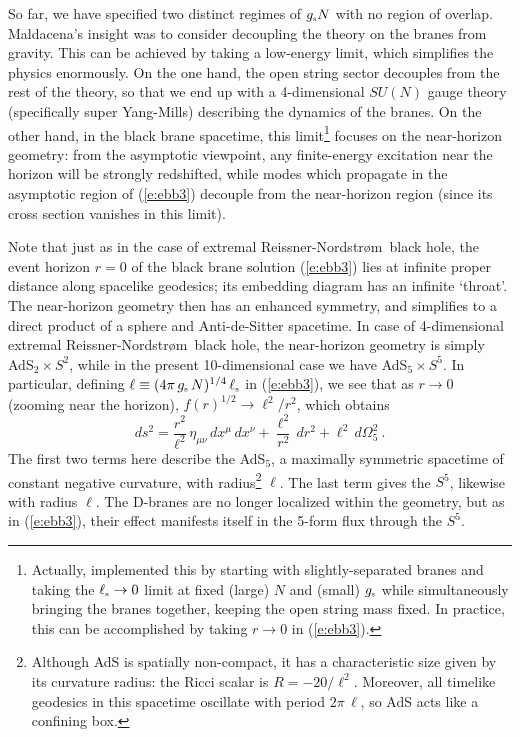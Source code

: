 \documentclass[12pt]{article}
\def\req#1{(\ref{#1})}
\def\RN{Reissner-Nordstr\o m}
\def\gst{g_{\scriptscriptstyle {\rm s}}}
\def\lst{\ell_{\scriptscriptstyle {\rm s}}}
\def\adss#1#2{AdS$_{#1} \times S^{#2}$}
\def\Rads{\ell}
\begin{document}
So far, we have specified two distinct regimes of $\gst N$ with no region of overlap.  Maldacena's insight was to consider decoupling the theory on the branes from gravity.  This can be achieved by taking a low-energy limit, which simplifies the physics enormously.    
On the one hand, the open string sector decouples from the rest of the theory, so that we end up with a 4-dimensional $SU(N)$ gauge theory (specifically super Yang-Mills) describing the dynamics of the branes.  On the other hand, in the black brane spacetime, this limit\footnote{
Actually, \cite{Maldacena:1997re} implemented this by starting with slightly-separated branes and taking the $\lst \to 0$ limit at fixed (large) $N$ and (small) $\gst$ while simultaneously bringing the branes together, keeping the open string mass fixed.  In practice, this can be accomplished by taking $r \to 0$ in \req{e:ebb3}. } focuses on the near-horizon geometry:  from the asymptotic viewpoint, any finite-energy excitation near the horizon will be strongly redshifted, while modes which propagate in the asymptotic region of \req{e:ebb3} decouple from the near-horizon region (since its cross section vanishes in this limit). 

Note that just as in the case of extremal \RN\ black hole,  the event horizon $r=0$ of the black brane solution  \req{e:ebb3} lies at infinite proper distance along spacelike geodesics; its embedding diagram has an infinite `throat'. The near-horizon geometry then has an enhanced symmetry, and simplifies to a direct product of a sphere and Anti-de-Sitter spacetime.  In case of 4-dimensional extremal \RN\ black hole, the near-horizon geometry is simply \adss22,  while in the present 10-dimensional case we have \adss55.  In particular, defining  $\Rads \equiv (4 \pi \, \gst \, N)^{1/4} \, \lst$ in \req{e:ebb3}, we see that  as $r \to 0$ (zooming near the horizon), 
$f(r)^{1/2} \to \Rads^2/r^2$, which obtains
%
\begin{equation}
ds^2 = \frac{r^2}{\Rads^2} \,  \eta_{\mu\nu} \, dx^\mu \, dx^\nu 
+ \frac{\Rads^2}{r^2} \, dr^2 + \Rads^2 \, d\Omega_5^2 \ .
\label{e:A5S5}
\end{equation}	
%
The first two terms here describe the AdS$_5$, a maximally symmetric spacetime of constant negative curvature, with radius\footnote{
Although AdS is spatially non-compact, it has a characteristic size given by its curvature radius:  the Ricci scalar is 
$R=-20 / \Rads^2$. 
Moreover, all timelike geodesics in this spacetime oscillate with period $2 \pi \, \Rads$, so AdS acts like a confining box.
} 
$\Rads$. The last term gives the $S^5$, 
likewise with radius  $\Rads$.
The D-branes are no longer localized within the geometry, but as in \req{e:ebb3}, their effect manifests itself in the 5-form flux through the $S^5$.
\end{document}
